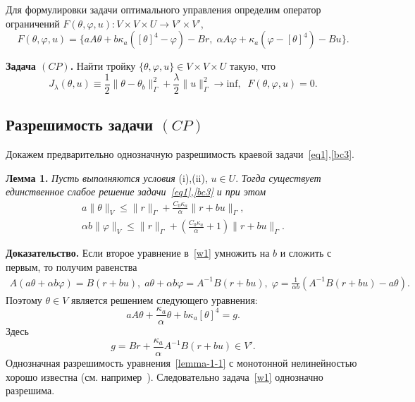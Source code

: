Для формулировки задачи оптимального управления определим оператор
ограничений $F(\theta, \varphi, u) : V \times V \times U \rightarrow V' \times V'$,
\[
    F(\theta, \varphi, u) = \{ aA\theta + b \kappa_a ( [\theta]^4- \varphi) - Br,\;
    \alpha A \varphi + \kappa_a (\varphi -[\theta]^4) - Bu\}.
\]


\textbf{Задача $(CP)$.} Найти тройку $\{\theta, \varphi, u \} \in V \times V \times U$
такую, что
\begin{equation}
    \label{CP}
    J_\lambda(\theta, u) \equiv \frac{1}{2}\|\theta -\theta_b\|^2_\Gamma
    + \frac{\lambda}{2}\|u\|^2_\Gamma \rightarrow \text{inf},\;\; F(\theta, \varphi, u)=0.
\end{equation}

\subsection{Разрешимость задачи $(CP)$}\label{subsec:ch2/sec2/subsec3}


Докажем предварительно однозначную разрешимость краевой задачи~\eqref{eq1},\eqref{bc3}.

\textbf{Лемма 1.}
\textit{Пусть выполняются условия} (i),(ii), $u\in U$. \textit{Тогда
существует единственное слабое решение задачи~\eqref{eq1},\eqref{bc3} и при этом}
\begin{equation}
    \label{E1}
    \begin{aligned}
        a\|\theta\|_V \leq \|r\|_\Gamma + \frac{C_0\kappa_a}{\alpha}\|r+bu\|_\Gamma, \\
        \alpha b \|\varphi\|_V \leq \|r\|_\Gamma +
        \left(\frac{C_0\kappa_a}{\alpha} + 1\right)\|r+bu\|_\Gamma.
    \end{aligned}
\end{equation}

\textbf{Доказательство.}
Если второе уравнение в~\eqref{w1} умножить на $b$ и сложить с первым, то получим равенства
\begin{gather*}
    A \left( a \theta + \alpha b \varphi \right) = B(r + bu),\;
    a\theta + \alpha b \varphi = A^{-1}B(r + bu),\;
    \varphi = \frac{1}{\alpha b}(A^{-1}B(r +bu) - a\theta).
\end{gather*}
Поэтому $\theta \in V$ является решением следующего уравнения:
\begin{equation}
    \label{lemma-1-1}
    a A \theta + \frac{\kappa_a}{\alpha} \theta + b\kappa_a [\theta]^4 = g.
\end{equation}
Здесь \[ g = Br + \frac{\kappa_a}{\alpha}A^{-1}B(r+bu) \in V'. \]
Однозначная разрешимость уравнения~\eqref{lemma-1-1} с монотонной нелинейностью
хорошо известна (см.
например~\cite{Kufner}).
Следовательно задача~\eqref{w1} однозначно разрешима.

